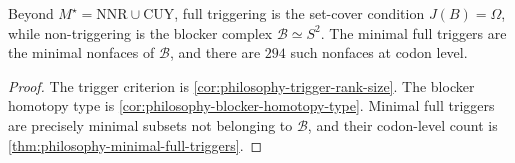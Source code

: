 \begin{theorem}
\label{thm:philosophy-trigger-blocker-duality-theorem}
Beyond $M^{\star}=\mathrm{NNR}\cup\mathrm{CUY}$, full triggering is the
set-cover condition $J(B)=\Omega$, while non-triggering is the blocker
complex $\mathcal{B}\simeq S^{2}$. The minimal full triggers are the
minimal nonfaces of $\mathcal{B}$, and there are $294$ such nonfaces at
codon level.
\end{theorem}
\begin{proof}
The trigger criterion is \autoref{cor:philosophy-trigger-rank-size}.
The blocker homotopy type is
\autoref{cor:philosophy-blocker-homotopy-type}. Minimal full triggers
are precisely minimal subsets not belonging to $\mathcal{B}$, and their
codon-level count is \autoref{thm:philosophy-minimal-full-triggers}.
\end{proof}

